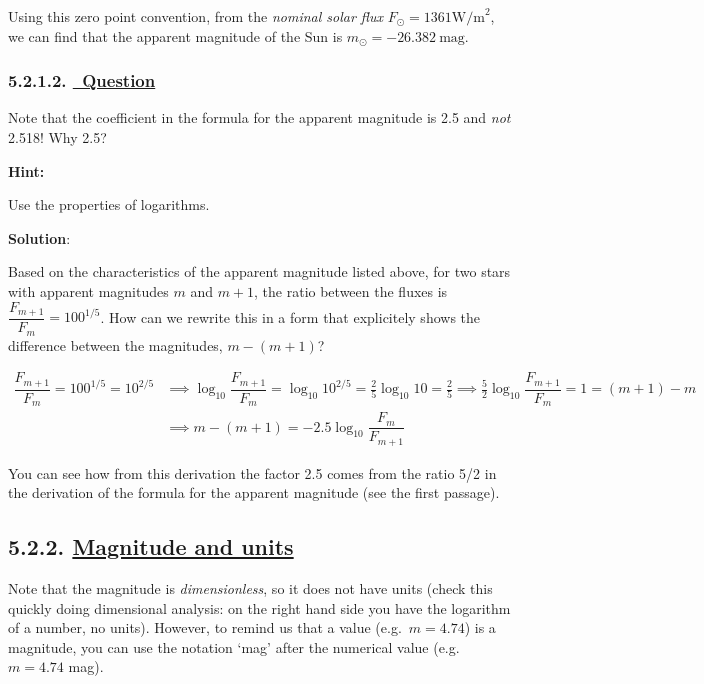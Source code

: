 \documentclass[
  letterpaper,
  DIV=11,
  numbers=noendperiod]{scrreprt}
\begin{document}
Using this zero point convention, from the \emph{nominal solar flux}
\(F_\odot = 1361 \mathrm{W/m}^2\), we can find that the apparent
magnitude of the Sun is \(m_\odot=-26.382\ \mathrm{mag}\).

\hypertarget{question-1}{%
\subsubsection{\texorpdfstring{5.2.1.2.
\protect\hyperlink{toc0_}{~Question}}{5.2.1.2. ~Question}}\label{question-1}}

Note that the coefficient in the formula for the apparent magnitude is
2.5 and \emph{not} 2.518! Why 2.5?

\textbf{Hint:}

Use the properties of logarithms.

\textbf{Solution}:

Based on the characteristics of the apparent magnitude listed above, for
two stars with apparent magnitudes \(m\) and \(m+1\), the ratio between
the fluxes is \(\dfrac{F_{m+1}}{F_m}=100^{1/5}\). How can we rewrite
this in a form that explicitely shows the difference between the
magnitudes, \(m-(m+1)\)?

\begin{align}
\dfrac{F_{m+1}}{F_m}=100^{1/5}=10^{2/5} &\implies \log_{10}{\dfrac{F_{m+1}}{F_m}}=\log_{10}{10^{2/5}}=\frac{2}{5}\log_{10}{10}=\frac{2}{5} \implies \frac{5}{2}\log_{10}{\dfrac{F_{m+1}}{F_m}} = 1 = (m+1) - m \\
&\implies m-(m+1)=-2.5\log_{10}{\dfrac{F_m}{F_{m+1}}}
\end{align}

You can see how from this derivation the factor 2.5 comes from the ratio
5/2 in the derivation of the formula for the apparent magnitude (see the
first passage).

\hypertarget{magnitude-and-units}{%
\subsection{\texorpdfstring{5.2.2. \protect\hyperlink{toc0_}{Magnitude
and units}}{5.2.2. Magnitude and units}}\label{magnitude-and-units}}

Note that the magnitude is \emph{dimensionless}, so it does not have
units (check this quickly doing dimensional analysis: on the right hand
side you have the logarithm of a number, no units). However, to remind
us that a value (e.g.~\(m=4.74\)) is a magnitude, you can use the
notation `mag' after the numerical value (e.g.~\(m=4.74\) mag).
\end{document}
